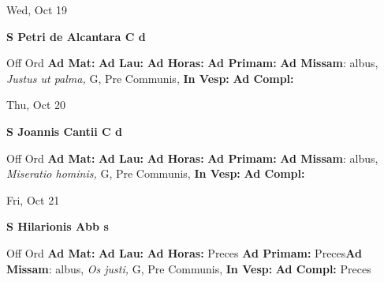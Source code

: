 \documentclass[10pt]{book}
\begin{document}
\begin{center}
\begin{minipage}{3.5in}
\vspace{2em}
\begin{center}Wed, Oct 19
\end{center}
\textbf{ \large S Petri de Alcantara C
\textnormal{\normalsize d}}

\begin{justify}Off Ord
\textbf{Ad Mat: }
\textbf{Ad Lau: }
\textbf{Ad Horas: }
\textbf{Ad Primam: }\textbf{Ad Missam}: albus, \textit{Justus ut palma,} G, Pre Communis, 
\textbf{In Vesp: }
\textbf{Ad Compl: }
\end{justify}
\end{minipage}
\end{center}

\begin{center}
\begin{minipage}{3.5in}
\vspace{2em}
\begin{center}Thu, Oct 20
\end{center}
\textbf{ \large S Joannis Cantii C
\textnormal{\normalsize d}}

\begin{justify}Off Ord
\textbf{Ad Mat: }
\textbf{Ad Lau: }
\textbf{Ad Horas: }
\textbf{Ad Primam: }\textbf{Ad Missam}: albus, \textit{Miseratio hominis,} G, Pre Communis, 
\textbf{In Vesp: }
\textbf{Ad Compl: }
\end{justify}
\end{minipage}
\end{center}

\begin{center}
\begin{minipage}{3.5in}
\vspace{2em}
\begin{center}Fri, Oct 21
\end{center}
\textbf{ \large S Hilarionis Abb
\textnormal{\normalsize s}}

\begin{justify}Off Ord
\textbf{Ad Mat: }
\textbf{Ad Lau: }
\textbf{Ad Horas: }Preces
\textbf{Ad Primam: }Preces\textbf{Ad Missam}: albus, \textit{Os justi,} G, Pre Communis, 
\textbf{In Vesp: }
\textbf{Ad Compl: }Preces
\end{justify}
\end{minipage}
\end{center}
\end{document}
